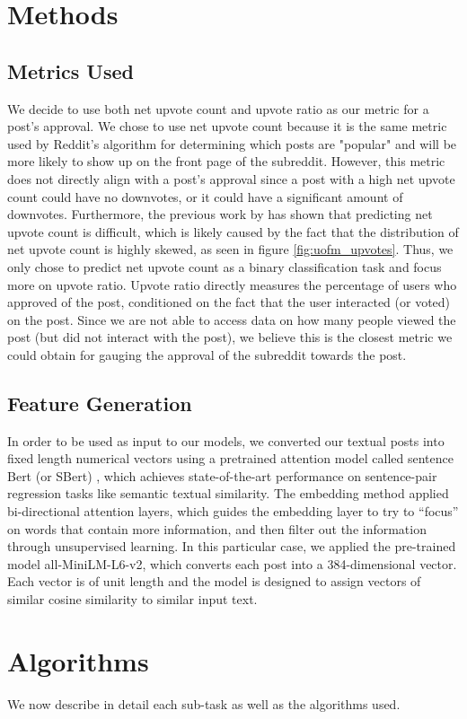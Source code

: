 \documentclass[11pt,a4paper]{article}
\let\Oldsection\section
\renewcommand{\section}{\FloatBarrier\Oldsection}
\let\Oldsubsection\subsection
\renewcommand{\subsection}{\FloatBarrier\Oldsubsection}
\begin{document}
\Oldsection{Methods}
\label{sec:methods}
    \Oldsubsection{Metrics Used}
        We decide to use both net upvote count and upvote ratio as our metric for a post's approval. We chose to use net upvote count because it is the same metric used by Reddit's algorithm for determining which posts are "popular" and will be more likely to show up on the front page of the subreddit. However, this metric does not directly align with a post's approval since a post with a high net upvote count could have no downvotes, or it could have a significant amount of downvotes. Furthermore, the previous work by \citet{Shuaibi2019} has shown that predicting net upvote count is difficult, which is likely caused by the fact that the distribution of net upvote count is highly skewed, as seen in figure \ref{fig:uofm_upvotes}. Thus, we only chose to predict net upvote count as a binary classification task and focus more on upvote ratio. Upvote ratio directly measures the percentage of users who approved of the post, conditioned on the fact that the user interacted (or voted) on the post. Since we are not able to access data on how many people viewed the post (but did not interact with the post), we believe this is the closest metric we could obtain for gauging the approval of the subreddit towards the post.

        

    \Oldsubsection{Feature Generation}
        In order to be used as input to our models, we converted our textual posts into fixed length numerical vectors using a pretrained attention model called sentence Bert (or SBert) \citep{Sbert2019}, which achieves state-of-the-art performance on sentence-pair regression tasks like semantic textual similarity. The embedding method applied bi-directional attention layers, which guides the embedding layer to try to “focus” on words that contain more information, and then filter out the information through unsupervised learning. In this particular case, we applied the pre-trained model all-MiniLM-L6-v2, which converts each post into a 384-dimensional vector. Each vector is of unit length and the model is designed to assign vectors of similar cosine similarity to similar input text.


\Oldsection{Algorithms}
\label{sec:algorithms}
    We now describe in detail each sub-task as well as the algorithms used.
\end{document}
